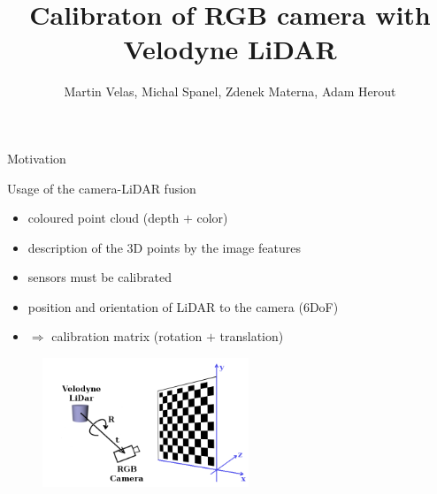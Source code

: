 \documentclass[pdf]{beamer}
\begin{document}
	\usenavigationsymbolstemplate{}
	\title {Calibraton of RGB camera with Velodyne LiDAR}
	\author {Martin Velas, Michal Spanel, Zdenek Materna, Adam Herout}
	\begin{frame}
		\titlepage
	\end{frame}
	
	\begin{frame}{Motivation}
 		\begin{block}{Usage of the camera-LiDAR fusion}
			\begin{itemize}
				\item coloured point cloud (depth $+$ color)
				\item description of the $3$D points by the image features
				\item sensors must be calibrated
			\end{itemize}
		\end{block}

		\begin{itemize}
			\item position and orientation of LiDAR to the camera ($6$DoF)
			\item $\Rightarrow$ calibration matrix (rotation $+$ translation)
		\end{itemize}
		
		\begin{figure}[h]
			\center
			\includegraphics[width=0.55\textwidth]{fig/schema.png}
		\end{figure}
			
	\end{frame}
	
\end{document}

